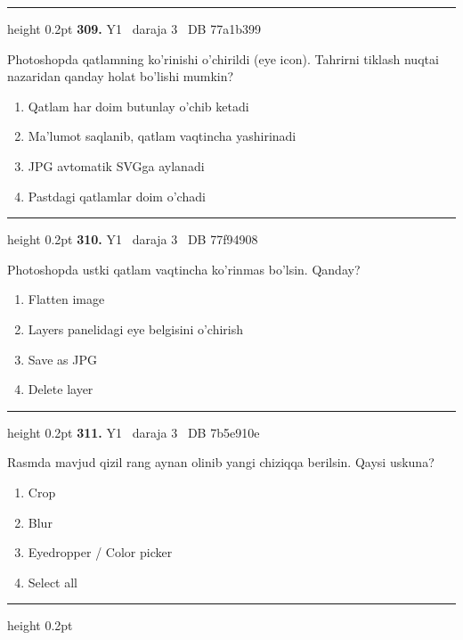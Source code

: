 \documentclass[10pt,a4paper,oneside]{article}
\begin{document}
\vspace{2mm}\hrule height 0.2pt \vspace{4mm}
\hypertarget{q309}{\textbf{\color{ink}309.}}  {\color{muted}\scriptsize Y1 \textbullet\ daraja 3 \textbullet\ DB 77a1b399}
\par
Photoshopda qatlamning ko'rinishi o'chirildi (eye icon). Tahrirni tiklash nuqtai nazaridan qanday holat bo'lishi mumkin?
\begin{enumerate}[label=\Alph*),leftmargin=9mm]
\item Qatlam har doim butunlay o'chib ketadi
\item Ma'lumot saqlanib, qatlam vaqtincha yashirinadi
\item JPG avtomatik SVGga aylanadi
\item Pastdagi qatlamlar doim o'chadi
\end{enumerate}
\vspace{2mm}\hrule height 0.2pt \vspace{4mm}
\hypertarget{q310}{\textbf{\color{ink}310.}}  {\color{muted}\scriptsize Y1 \textbullet\ daraja 3 \textbullet\ DB 77f94908}
\par
Photoshopda ustki qatlam vaqtincha ko'rinmas bo'lsin. Qanday?
\begin{enumerate}[label=\Alph*),leftmargin=9mm]
\item Flatten image
\item Layers panelidagi eye belgisini o'chirish
\item Save as JPG
\item Delete layer
\end{enumerate}
\vspace{2mm}\hrule height 0.2pt \vspace{4mm}
\hypertarget{q311}{\textbf{\color{ink}311.}}  {\color{muted}\scriptsize Y1 \textbullet\ daraja 3 \textbullet\ DB 7b5e910e}
\par
Rasmda mavjud qizil rang aynan olinib yangi chiziqqa berilsin. Qaysi uskuna?
\begin{enumerate}[label=\Alph*),leftmargin=9mm]
\item Crop
\item Blur
\item Eyedropper / Color picker
\item Select all
\end{enumerate}
\vspace{2mm}\hrule height 0.2pt \vspace{4mm}
\end{document}
